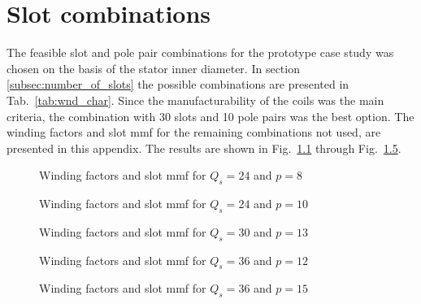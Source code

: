 \chapter{Slot combinations}
The feasible slot and pole pair combinations for the prototype case study was chosen on the basis of the stator inner diameter. In section \ref{subsec:number_of_slots} the possible combinations are presented in Tab.~\ref{tab:wnd_char}. Since the manufacturability of the coils was the main criteria, the combination with 30 slots and 10 pole pairs was the best option. The winding factors and slot mmf for the remaining combinations not used, are presented in this appendix. The results are shown in Fig.~\ref{fig:q24p8} through Fig.~\ref{fig:q36p15}.

\begin{figure}
	\centering
		 
		\caption{Winding factors and slot mmf for $Q_s=24$ and $p=8$}
		\label{fig:q24p8}
\end{figure}

\begin{figure}
	\centering
		 
		\caption{Winding factors and slot mmf for $Q_s=24$ and $p=10$}
		\label{fig:q24p10}		
\end{figure}

\begin{figure}
	\centering
		 
		\caption{Winding factors and slot mmf for $Q_s=30$ and $p=13$}
		\label{fig:q30p13}	
\end{figure}

\begin{figure}
	\centering
		 
		\caption{Winding factors and slot mmf for $Q_s=36$ and $p=12$}
		\label{fig:q36p12}	
\end{figure}

\begin{figure}
	\centering
		 
		\caption{Winding factors and slot mmf for $Q_s=36$ and $p=15$}
		\label{fig:q36p15}	
\end{figure}

\endinput